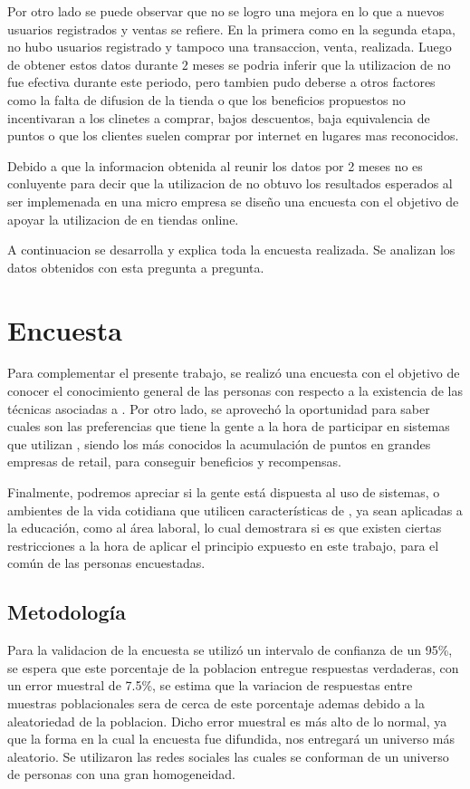 Por otro lado se puede observar que no se logro una mejora en lo que a nuevos usuarios registrados y 
ventas se refiere. En la primera como en la segunda etapa, no hubo usuarios registrado y tampoco
una transaccion, venta, realizada.
Luego de obtener estos datos durante $2$ meses se podria inferir que la utilizacion de {\GAM} no fue 
efectiva durante este periodo, pero tambien pudo deberse a otros factores como la falta de difusion 
de la tienda o que los beneficios propuestos no incentivaran a los clinetes a comprar, bajos descuentos,
baja equivalencia de puntos o que los clientes suelen comprar por internet en lugares mas reconocidos.

Debido a que la informacion obtenida al reunir los datos por 2 meses no es conluyente para decir que
la utilizacion de {\GAM} no obtuvo los resultados esperados al ser implemenada en una micro empresa se
diseño una encuesta con el objetivo de apoyar la utilizacion de {\GAM} en tiendas online.

A continuacion se desarrolla y explica toda la encuesta realizada. Se analizan los datos obtenidos 
con esta pregunta a pregunta. 

\section{Encuesta}

Para complementar el presente trabajo, se realizó una encuesta con el objetivo de
conocer el conocimiento general de las personas con respecto a la existencia
de las técnicas asociadas a {\GAM}.
Por otro lado, se aprovechó la oportunidad para saber cuales son las preferencias
que tiene la gente a la hora de participar en sistemas que utilizan {\GAM},
siendo los más conocidos la acumulación de puntos en grandes empresas de retail,
para conseguir beneficios y recompensas.

Finalmente, podremos apreciar si la gente está dispuesta al uso de sistemas,
o ambientes de la vida cotidiana que utilicen características de {\GAM},
ya sean aplicadas a la educación, como al área laboral, lo cual demostrara
 si es que existen ciertas restricciones a la hora de aplicar
el principio expuesto en este trabajo, para el común de las personas
encuestadas.

\subsection{Metodología}

Para la validacion de la encuesta se utilizó un intervalo de confianza de un 95\%, se espera que
este porcentaje de la poblacion entregue respuestas verdaderas, con un error
muestral de 7.5\%, se estima que la variacion de respuestas entre muestras poblacionales
 sera de cerca de este porcentaje ademas debido a la aleatoriedad de la poblacion.
Dicho error muestral es más alto de lo normal, ya que la forma en la cual la encuesta fue difundida,
 nos entregará un universo más aleatorio. Se utilizaron las redes sociales las cuales 
se conforman de un universo de personas con una gran homogeneidad.

